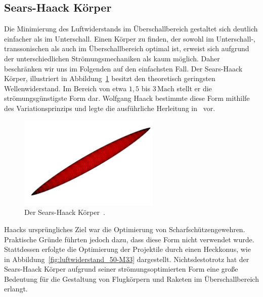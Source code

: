 \subsection{Sears-Haack Körper}
Die Minimierung des Luftwiderstands im Überschallbereich 
gestaltet sich deutlich einfacher als im Unterschall. 
Einen Körper zu finden, der sowohl im Unterschall-, 
transsonischen als auch im Überschallbereich optimal ist, 
erweist sich aufgrund der unterschiedlichen 
Strömungsmechaniken als kaum möglich.
Daher beschränken wir uns im Folgenden auf den einfachsten Fall.
Der Sears-Haack Körper, illustriert in Abbildung~\ref{fig:sears_haack} 
besitzt den theoretisch geringsten Wellenwiderstand. 
Im Bereich von etwa $1{,}5$ bis $3\,\mathrm{Mach}$ 
stellt er die strömungsgünstigste Form dar. 
Wolfgang Haack bestimmte diese Form mithilfe des 
Variationsprinzips und legte die ausführliche Herleitung 
in~\cite{Haack1941} vor.
\begin{figure}
    \centering
    \includegraphics[width=0.6\textwidth]{papers/ueberschall/figures/Sears-Haack.png}
    \caption{Der Sears-Haack Körper~\cite{SearsHaackWikipedia}.}
    \label{fig:sears_haack}
\end{figure}

Haacks ursprüngliches Ziel war die Optimierung von Scharfschützengewehren. 
Praktische Gründe führten jedoch dazu, dass diese 
Form nicht verwendet wurde. 
Stattdessen erfolgte die Optimierung der Projektile 
durch einen Heckkonus, wie in Abbildung~\ref{fig:luftwiderstand_50-M33} dargestellt.
Nichtsdestotrotz hat der Sears-Haack Körper aufgrund 
seiner strömungsoptimierten Form eine große Bedeutung 
für die Gestaltung von Flugkörpern und Raketen im 
Überschallbereich erlangt.


 